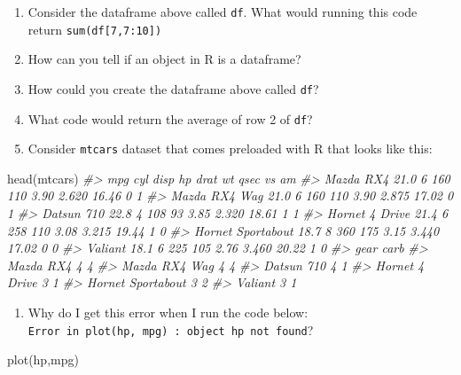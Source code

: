 \documentclass[
]{book}
\newenvironment{Shaded}{\begin{snugshade}}{\end{snugshade}}
\newcommand{\CommentTok}[1]{\textcolor[rgb]{0.56,0.35,0.01}{\textit{#1}}}
\newcommand{\FunctionTok}[1]{\textcolor[rgb]{0.00,0.00,0.00}{#1}}
\newcommand{\NormalTok}[1]{#1}
\providecommand{\tightlist}{%
  \setlength{\itemsep}{0pt}\setlength{\parskip}{0pt}}
\begin{document}
\begin{enumerate}
\def\labelenumi{\arabic{enumi}.}
\item
  Consider the dataframe above called \texttt{df}. What would running this code return \texttt{sum(df{[}7,7:10{]})}
\item
  How can you tell if an object in R is a dataframe?
\item
  How could you create the dataframe above called \texttt{df}?
\item
  What code would return the average of row 2 of \texttt{df}?
\item
  Consider \texttt{mtcars} dataset that comes preloaded with R that looks like this:
\end{enumerate}

\begin{Shaded}
\begin{Highlighting}[]
\FunctionTok{head}\NormalTok{(mtcars)}
\CommentTok{\#\textgreater{}                    mpg cyl disp  hp drat    wt  qsec vs am}
\CommentTok{\#\textgreater{} Mazda RX4         21.0   6  160 110 3.90 2.620 16.46  0  1}
\CommentTok{\#\textgreater{} Mazda RX4 Wag     21.0   6  160 110 3.90 2.875 17.02  0  1}
\CommentTok{\#\textgreater{} Datsun 710        22.8   4  108  93 3.85 2.320 18.61  1  1}
\CommentTok{\#\textgreater{} Hornet 4 Drive    21.4   6  258 110 3.08 3.215 19.44  1  0}
\CommentTok{\#\textgreater{} Hornet Sportabout 18.7   8  360 175 3.15 3.440 17.02  0  0}
\CommentTok{\#\textgreater{} Valiant           18.1   6  225 105 2.76 3.460 20.22  1  0}
\CommentTok{\#\textgreater{}                   gear carb}
\CommentTok{\#\textgreater{} Mazda RX4            4    4}
\CommentTok{\#\textgreater{} Mazda RX4 Wag        4    4}
\CommentTok{\#\textgreater{} Datsun 710           4    1}
\CommentTok{\#\textgreater{} Hornet 4 Drive       3    1}
\CommentTok{\#\textgreater{} Hornet Sportabout    3    2}
\CommentTok{\#\textgreater{} Valiant              3    1}
\end{Highlighting}
\end{Shaded}

\begin{enumerate}
\def\labelenumi{\arabic{enumi}.}
\setcounter{enumi}{5}
\tightlist
\item
  Why do I get this error when I run the code below: \texttt{Error\ in\ plot(hp,\ mpg)\ :\ object\ \textquotesingle{}hp\textquotesingle{}\ not\ found}?
\end{enumerate}

\begin{Shaded}
\begin{Highlighting}[]
\FunctionTok{plot}\NormalTok{(hp,mpg)}
\end{Highlighting}
\end{Shaded}
\end{document}
